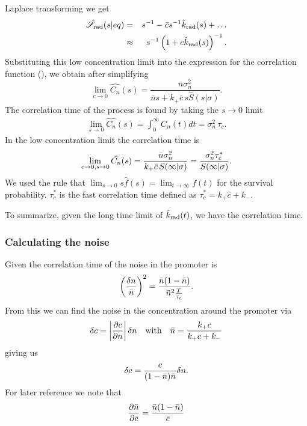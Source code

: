 Laplace transforming we get
\begin{eqnarray}
 \hat{\mathscr{S}}_{\rm rad}(s|eq) & = & s^{-1} - \bar{c} s^{-1} \hat{k}_{\rm rad}(s) + \ldots \\
  & \approx & s^{-1} \left( 1 + c \hat{k}_{\rm rad}(s)\right)^{-1}.
\elabel{Geq}
\end{eqnarray}
Substituting this low concentration limit into the expression for the correlation function (), we obtain after simplifying
\begin{equation}
 \lim_{c \rightarrow 0} \hat{C_n}(s) = \frac{\bar{n} \sigma_n^2}{\bar{n} s + k_+ \bar{c} \, s \hat{S}(s|\sigma)}.
\end{equation}
The correlation time of the process is found by taking the $s \rightarrow 0$ limit
\begin{eqnarray}
 \lim_{s \rightarrow 0} \hat{C_n}(s) = \int_0^\infty C_n(t) dt = \sigma_n^2 \, \tau_c.
\end{eqnarray}
In the low concentration limit the correlation time is
\begin{equation}
 \lim_{c \rightarrow 0, s \rightarrow 0} \hat{C_n}(s) = \frac{\bar{n} \sigma_n^2}{k_+ \bar{c} \, S(\infty|\sigma)} = \frac{\sigma_n^2 \tau_c^*}{S(\infty|\sigma)}.
 \elabel{CT1}
\end{equation}
We used the rule that $\lim_{s \rightarrow 0} s \hat{f}(s) = \lim_{t \rightarrow \infty} f(t)$ for the survival probability. $\tau_c^*$ is the fast correlation time defined as $\tau_c^* = k_+ \hat{c} + k_-$.

To summarize, given the long time limit of $\hat{k}_{\rm rad}(t)$, we have the correlation time.

\subsubsection{Calculating the noise}
Given the correlation time of the noise in the promoter is
\begin{equation}
 \left( \frac{\delta n}{\bar{n}} \right)^2 = \frac{\bar{n}(1-\bar{n})}{\bar{n}^2\frac{T}{\tau_c}}.
 \elabel{EqProNoise}
\end{equation}
From this we can find the noise in the concentration around the promoter via
\begin{equation}
 \delta c = \left|\frac{\partial c}{\partial n}\right| \delta n \quad {\rm with} \quad \bar{n} = \frac{k_+ c}{k_+ c + k_-}
\end{equation}
giving us
\begin{equation}
 \delta c = \frac{c}{(1-\bar{n})\bar{n}}\delta n.
 \elabel{EqConNoise}
\end{equation}
For later reference we note that
\begin{equation}
 \frac{\partial \bar{n}}{\partial \bar{c}} = \frac{\bar{n}(1-\bar{n})}{\bar{c}}
 \elabel{EqProNoiseII}
\end{equation}

